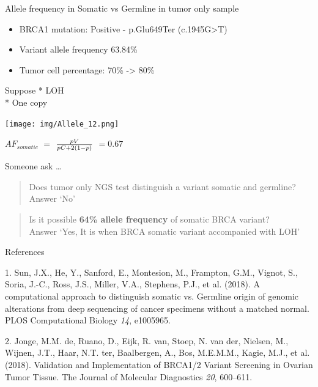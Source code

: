 \documentclass[
  ignorenonframetext,
]{beamer}
\providecommand{\tightlist}{%
  \setlength{\itemsep}{0pt}\setlength{\parskip}{0pt}}
\begin{document}
\begin{frame}{Allele frequency in Somatic vs Germline in tumor only
sample}
\protect\hypertarget{allele-frequency-in-somatic-vs-germline-in-tumor-only-sample-1}{}

\begin{itemize}
\tightlist
\item
  BRCA1 mutation: Positive - p.Glu649Ter (c.1945G\textgreater{}T)\\
\item
  Variant allele frequency 63.84\%\\
\item
  Tumor cell percentage: 70\% -\textgreater{} 80\%
\end{itemize}

Suppose * LOH\\
* One copy

\texttt{[image: img/Allele\_12.png]}

\(AF_{somatic}\) \(=\) \(pV \over pC+2(1-p)\) \(= 0.67\)

\end{frame}

\begin{frame}{Someone ask \ldots{}}
\protect\hypertarget{someone-ask}{}

\begin{quote}
Does tumor only NGS test distinguish a variant somatic and germline?\\
Answer `No'
\end{quote}

\begin{quote}
Is it possible \textbf{64\% allele frequency} of somatic BRCA variant?\\
Answer `Yes, It is when BRCA somatic variant accompanied with LOH'
\end{quote}

\end{frame}

\begin{frame}{References}
\protect\hypertarget{references}{}

\hypertarget{refs}{}
\leavevmode\hypertarget{ref-sun_2018_computational_ploscomputationalbiology}{}%
1. Sun, J.X., He, Y., Sanford, E., Montesion, M., Frampton, G.M.,
Vignot, S., Soria, J.-C., Ross, J.S., Miller, V.A., Stephens, P.J., et
al. (2018). A computational approach to distinguish somatic vs. Germline
origin of genomic alterations from deep sequencing of cancer specimens
without a matched normal. PLOS Computational Biology \emph{14},
e1005965.

\leavevmode\hypertarget{ref-dejonge_2018_validation_thejournalofmoleculardiagnostics}{}%
2. Jonge, M.M. de, Ruano, D., Eijk, R. van, Stoep, N. van der, Nielsen,
M., Wijnen, J.T., Haar, N.T. ter, Baalbergen, A., Bos, M.E.M.M., Kagie,
M.J., et al. (2018). Validation and Implementation of BRCA1/2 Variant
Screening in Ovarian Tumor Tissue. The Journal of Molecular Diagnostics
\emph{20}, 600--611.

\end{frame}
\end{document}
